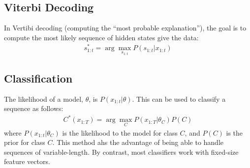 \subsection{Viterbi Decoding}
In Vertibi decoding (computing the ``most probable explanation''), the goal is
to compute the most likely sequence of hidden states give the data:
\begin{align*}
s_{1:t}^* = \arg\max_{s_{1:t}}P(s_{1:t}|x_{1:t})
\end{align*}

\subsection{Classification}
The likelihood of a model, $\theta$, is $P(x_{1:t}|\theta)$. This can be used to
classify a sequence as follows:
\begin{align*}
C^*(x_{1:T}) = \arg \max_{C} P(x_{1:T} | \theta_C)P(C)
\end{align*}
where $P(x_{1:t}|\theta_C)$ is the likelihood to the model for class $C$, and 
$P(C)$ is the prior for class $C$. This method ahs the advantage of being able
to handle sequences of variable-length. By contrast, most classifiers work with
fixed-size feature vectors.
